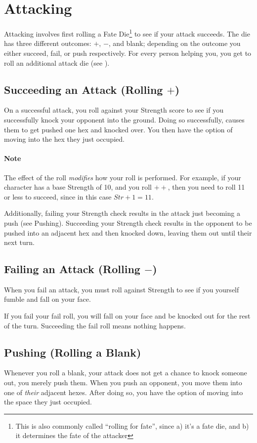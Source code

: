 \section{Attacking} \label{attacking}
Attacking involves first rolling a Fate Die\footnote{This is also commonly called ``rolling for fate'', since a) it's a fate die, and b) it determines the fate of the attacker} to see if your attack succeeds.
The die has three different outcomes: $+$, $-$, and blank; depending on the outcome you either succeed, fail, or push respectively.
For every person helping you, you get to roll an additional attack die (see ).

\subsection{Succeeding an Attack (Rolling $+$)}
On a successful attack, you roll against your Strength score to see if you successfully knock your opponent into the ground.
Doing so successfully, causes them to get pushed one hex and knocked over.
You then have the option of moving into the hex they just occupied.

\paragraph{Note} The effect of the roll \textit{modifies} how your roll is performed.
For example, if your character has a base Strength of 10, and you roll $++$, then you need to roll 11 or less to succeed, since in this case $Str+1=11$.

Additionally, failing your Strength check results in the attack just becoming a push (see Pushing).
Succeeding your Strength check results in the opponent to be pushed into an adjacent hex and then knocked down, leaving them out until their next turn.

\subsection{Failing an Attack (Rolling $-$)}
When you fail an attack, you must roll against Strength to see if you yourself fumble and fall on your face.

If you fail your fail roll, you will fall on your face and be knocked out for the rest of the turn.
Succeeding the fail roll means nothing happens.

\subsection{Pushing (Rolling a Blank)}
Whenever you roll a blank, your attack does not get a chance to knock someone out, you merely push them.
When you push an opponent, you move them into one of \textit{their} adjacent hexes.
After doing so, you have the option of moving into the space they just occupied.

